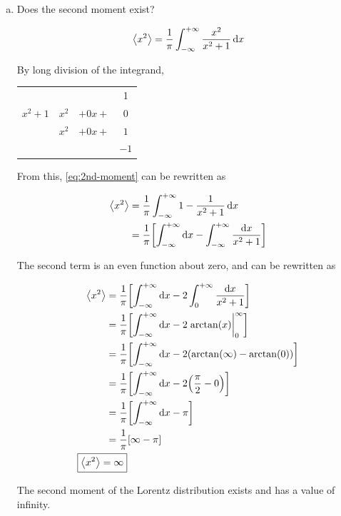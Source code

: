 \documentclass[9pt,a4paper,twocolumn]{article}
\begin{document}
\begin{enumerate}[(a)]
\item Does the second moment exist?

\begin{equation}\label{eq:2nd-moment}
	\ev{x^2} = \frac{1}{\pi} \int_{-\infty}^{+\infty} \frac{x^2}{x^2 +1}\dd{x}
\end{equation}

By long division of the integrand,

\begin{center}
	\begin{tabular}{c|ccc}
		&&& 1 \\ \cline{2-4}
		$x^2 + 1$ & $x^2$ & $+0x+$ & $0$ \\
		& $x^2$ & $+0x+$ & $1$ \\ \cline{2-4}
		&&& $-1$
	\end{tabular}
\end{center}

From this, \eqref{eq:2nd-moment} can be rewritten as

\begin{align*}
	\ev{x^2} &= \frac{1}{\pi} \int_{-\infty}^{+\infty} 1 - \frac{1}{x^2 + 1} \dd{x} \\
	&= \frac{1}{\pi}\qty[\int_{-\infty}^{+\infty} \dd{x} - \int_{-\infty}^{+\infty} \frac{\dd{x}}{x^2 + 1}]
\end{align*}

The second term is an even function about zero, and can be rewritten as

\begin{align}
	\ev{x^2} &= \frac{1}{\pi}\qty[\int_{-\infty}^{+\infty} \dd{x} - 2\int_0^{+\infty} \frac{\dd{x}}{x^2 + 1}] \nonumber \\
	&= \frac{1}{\pi}\qty[\int_{-\infty}^{+\infty} \dd{x} - 2\eval{\arctan(x)}_0^\infty] \nonumber \\
	&= \frac{1}{\pi}\qty[\int_{-\infty}^{+\infty} \dd{x} - 2\qty(\arctan(\infty) - \arctan(0))] \nonumber \\
	&= \frac{1}{\pi}\qty[\int_{-\infty}^{+\infty} \dd{x} - 2\qty(\frac{\pi}{2} - 0)] \nonumber \\
	&= \frac{1}{\pi}\qty[\int_{-\infty}^{+\infty} \dd{x} - \pi] \nonumber \\
	&= \frac{1}{\pi} \qty[\infty - \pi] \nonumber \\
	\Aboxed{
		\ev{x^2} &= \infty
	} \label{eq:answer-c}
\end{align}

The second moment of the Lorentz distribution exists and has a value of infinity.

\end{enumerate}
\end{document}
